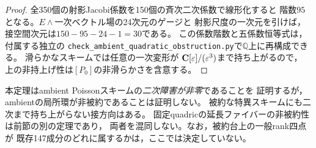 \begin{proof}
全350個の射影Jacobi係数を150個の斉次二次係数で線形化すると
階数$95$となる。$E\wedge$一次ベクトル場の24次元のゲージと
射影尺度の一次元を引けば，接空間次元は$150-95-24-1=30$である。
この係数階数と五係数恒等式は，付属する独立の
\texttt{check\_ambient\_quadratic\_obstruction.py}で$\mathbb Q$上に再構成できる。
滑らかなスキームでは任意の一次変形が
$\mathbf C[\varepsilon]/(\varepsilon^3)$まで持ち上がるので，
上の非持上げ性は$[P_0]$の非滑らかさを含意する。
\end{proof}

\begin{remark}[非被約性と特異性の区別]
\label{rem:ambient-obstruction-not-nonreduced}
本定理はambient Poissonスキームの\emph{二次障害が非零}であることを
証明するが，ambientの局所環が非被約であることは証明しない。
被約な特異スキームにも二次まで持ち上がらない接方向はある。
固定quadricの延長ファイバーの非被約性は前節の別の定理であり，
両者を混同しない。なお，被約台上の一般rank四点が
既存147成分のどれに属するかは，ここでは決定していない。
\end{remark}


